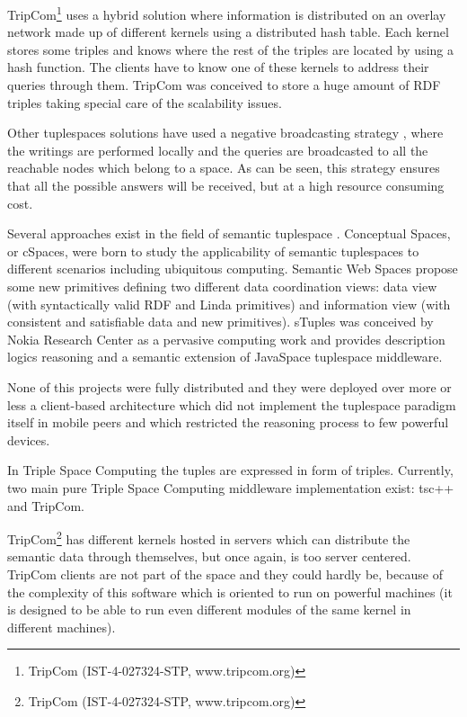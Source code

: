 
TripCom\footnote{TripCom (IST-4-027324-STP, www.tripcom.org)} uses a hybrid solution where information is distributed on
an overlay network made up of different kernels using a distributed hash table. Each kernel stores some triples and
knows where the rest of the triples are located by using a hash function. The clients have to know one of these
kernels to address their queries through them. TripCom was conceived to store a huge amount of RDF triples taking
special care of the scalability issues.

Other tuplespaces solutions have used a negative broadcasting strategy
\cite{krummenacher_open_2009,murphy_transiently_2006,gomez-goiri_semantic_2011}, where the writings are
performed locally and the queries are broadcasted to all the reachable nodes which belong to a space. As can be seen,
this strategy ensures that all the possible answers will be received, but at a high resource consuming cost.


Several approaches exist in the field of semantic tuplespace \cite{nixon_tuplespace-based_2008}.
Conceptual Spaces, or cSpaces, were born to study the applicability of semantic tuplespaces to different scenarios
including ubiquitous computing. Semantic Web Spaces propose some new primitives defining
two different data coordination views: data view (with syntactically valid RDF and Linda primitives) and information view
(with consistent and satisfiable data and new primitives). sTuples was conceived by Nokia Research Center as a pervasive
computing work and provides description logics reasoning and a semantic extension of JavaSpace tuplespace middleware.

None of this projects were fully distributed and they were deployed over more or less a client-based architecture which did not implement
the tuplespace paradigm itself in mobile peers and which restricted the reasoning process to few powerful devices.

In Triple Space Computing the tuples are expressed in form of triples. Currently, two main pure Triple Space Computing
middleware implementation exist: tsc++ and TripCom.

TripCom\footnote{TripCom (IST-4-027324-STP, www.tripcom.org)} has different kernels hosted in servers which can distribute the semantic data
through themselves, but once again, is too server centered. TripCom clients are not part of the space and they could hardly be, because of
the complexity of this software which is oriented to run on powerful machines (it is designed to be able to run even different modules of the
same kernel in different machines).

